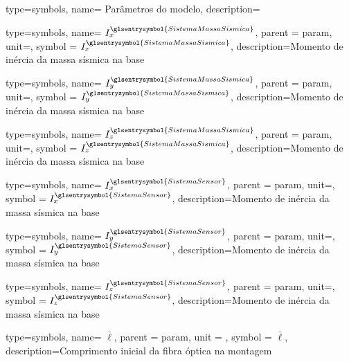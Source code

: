 {type=symbols,
	name= {Parâmetros do modelo},
	description={}
}


{type=symbols,
	name= \ensuremath{I_{x}^{\glsentrysymbol{SistemaMassaSismica}}},
	parent = {param},
	unit=\unexpanded{\si{\kilo\gram\meter\squared}},
	symbol = \ensuremath{I_{x}^{\glsentrysymbol{SistemaMassaSismica}}},
	description={Momento de inércia da massa sísmica na base }
}

{type=symbols,
	name= \ensuremath{I_{y}^{\glsentrysymbol{SistemaMassaSismica}}},
	parent = {param},
	unit=\unexpanded{\si{\kilo\gram\meter\squared}},
	symbol = \ensuremath{I_{y}^{\glsentrysymbol{SistemaMassaSismica}}},
	description={Momento de inércia da massa sísmica na base }
}

{type=symbols,
	name= \ensuremath{I_{z}^{\glsentrysymbol{SistemaMassaSismica}}},
	parent = {param},
	unit=\unexpanded{\si{\kilo\gram\meter\squared}},
	symbol = \ensuremath{I_{z}^{\glsentrysymbol{SistemaMassaSismica}}},
	description={Momento de inércia da massa sísmica na base }
}



{type=symbols,
	name= \ensuremath{I_{x}^{\glsentrysymbol{SistemaSensor}}},
	parent = {param},
	unit=\unexpanded{\si{\kilo\gram\meter\squared}},
	symbol = \ensuremath{I_{x}^{\glsentrysymbol{SistemaSensor}}},
	description={Momento de inércia da massa sísmica na base }
}

{type=symbols,
	name= \ensuremath{I_{y}^{\glsentrysymbol{SistemaSensor}}},
	parent = {param},
	unit=\unexpanded{\si{\kilo\gram\meter\squared}},
	symbol = \ensuremath{I_{y}^{\glsentrysymbol{SistemaSensor}}},
	description={Momento de inércia da massa sísmica na base }
}


{type=symbols,
	name= \ensuremath{I_{z}^{\glsentrysymbol{SistemaSensor}}},
	parent = {param},
	unit=\unexpanded{\si{\kilo\gram\meter\squared}},
	symbol = \ensuremath{I_{z}^{\glsentrysymbol{SistemaSensor}}},
	description={Momento de inércia da massa sísmica na base }
}


{type=symbols,
	name= \ensuremath{\bar{\ell}},
	parent = {param},
	unit = \unexpanded{\si{\meter}},
	symbol = \ensuremath{\bar{\ell}},
	description={Comprimento inicial da fibra óptica na montagem}
}

